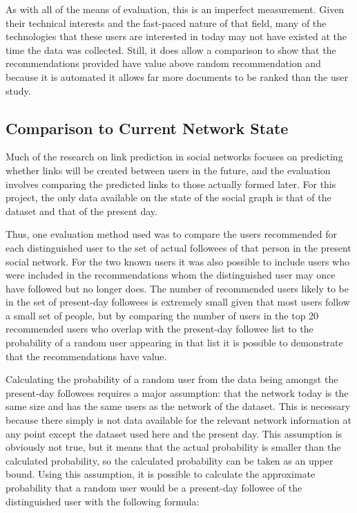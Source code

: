 As with all of the means of evaluation, this is an imperfect measurement. Given their technical interests and the fast-paced nature of that field, many of the technologies that these users are interested in today may not have existed at the time the data was collected. Still, it does allow a comparison to show that the recommendations provided have value above random recommendation and because it is automated it allows far more documents to be ranked than the user study.



\subsection{Comparison to Current Network State}
\label{sec:ComparisonToCurrentNetwork}

Much of the research on link prediction in social networks focuses on predicting whether links will be created between users in the future, and the evaluation involves comparing the predicted links to those actually formed later. For this project, the only data available on the state of the social graph is that of the dataset and that of the present day.

Thus, one evaluation method used was to compare the users recommended for each distinguished user to the set of actual followees of that person in the present social network. For the two known users it was also possible to include users who were included in the recommendations whom the distinguished user may once have followed but no longer does. The number of recommended users likely to be in the set of present-day followees is extremely small given that most users follow a small set of people, but by comparing the number of users in the top 20 recommended users who overlap with the present-day followee list to the probability of a random user appearing in that list it is possible to demonstrate that the recommendations have value.

Calculating the probability of a random user from the data being amongst the present-day followees requires a major assumption: that the network today is the same size and has the same users as the network of the dataset. This is necessary because there simply is not data available for the relevant network information at any point except the dataset used here and the present day. This assumption is obviously not true, but it means that the actual probability is smaller than the calculated probability, so the calculated probability can be taken as an upper bound. Using this assumption, it is possible to calculate the approximate probability that a random user would be a present-day followee of the distinguished user with the following formula:


